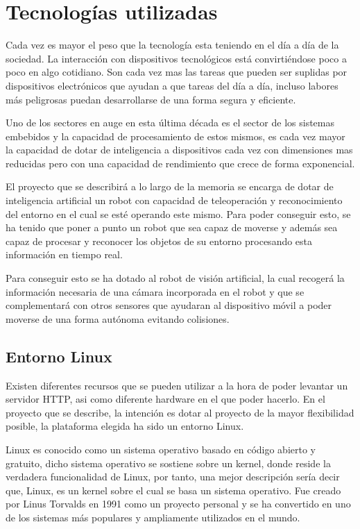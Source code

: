 
\section{Tecnologías utilizadas}
Cada vez es mayor el peso que la tecnología esta teniendo en el día a día de la sociedad. La interacción con dispositivos tecnológicos está convirtiéndose poco a poco en algo cotidiano. Son cada vez mas las tareas que pueden ser suplidas por dispositivos electrónicos que ayudan a que tareas del día a día, incluso labores más peligrosas puedan desarrollarse de una forma segura y eficiente.

Uno de los sectores en auge en esta última década es el sector de los sistemas embebidos y la capacidad de procesamiento de estos mismos, es cada vez mayor la capacidad de dotar de inteligencia a dispositivos cada vez con dimensiones mas reducidas pero con una capacidad de rendimiento que crece de forma exponencial.

El proyecto que se describirá a lo largo de la memoria se encarga de dotar de inteligencia artificial un robot con capacidad de teleoperación y reconocimiento del entorno en el cual se esté operando este mismo. Para poder conseguir esto, se ha tenido que poner a punto un robot que sea capaz de moverse y además sea capaz de procesar y reconocer los objetos de su entorno procesando esta información en tiempo real.

Para conseguir esto se ha dotado al robot de visión artificial, la cual recogerá la información necesaria de una cámara incorporada en el robot y que se complementará con otros sensores que ayudaran al dispositivo móvil a poder moverse de una forma autónoma evitando colisiones.

\subsection{Entorno Linux}
Existen diferentes recursos que se pueden utilizar a la hora de poder levantar un servidor HTTP, asi como diferente hardware en el que poder hacerlo. En el proyecto que se describe, la intención es dotar al proyecto de la mayor flexibilidad posible, la plataforma elegida ha sido un entorno Linux.

Linux es conocido como un sistema operativo basado en código abierto y gratuito, dicho sistema operativo se sostiene sobre un kernel, donde reside la verdadera funcionalidad de Linux, por tanto, una mejor descripción sería decir que, Linux, es un kernel sobre el cual se basa un sistema operativo. Fue creado por Linus Torvalds en 1991 como un proyecto personal y se ha convertido en uno de los sistemas más populares y ampliamente utilizados en el mundo.

